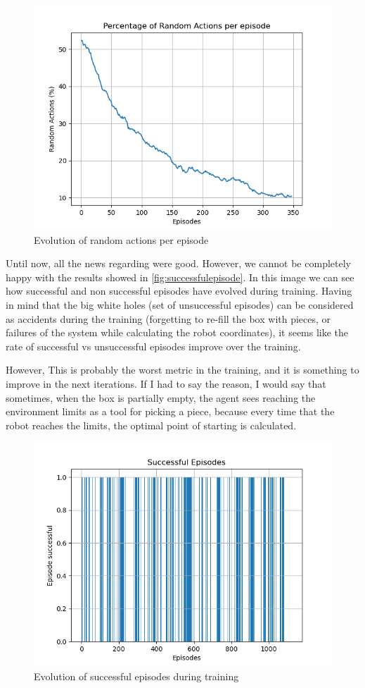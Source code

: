 	\begin{figure}[H]
		\centering
		\includegraphics[width=0.7\linewidth]{Images/original_algorithm/random_actions}
		\caption[Random actions per episodes]{Evolution of random actions per episode}
		\label{fig:randomactions}
	\end{figure}


	Until now, all the news regarding were good. However, we cannot be completely happy with the results showed in \autoref{fig:successfulepisode}. In this image we can see how successful and non successful episodes have evolved during training. Having in mind that the big white holes (set of unsuccessful episodes) can be considered as accidents during the training (forgetting to re-fill the box with pieces, or failures of the system while calculating the robot coordinates), it seems like the rate of successful vs unsuccessful episodes improve over the training.
	
	However, This is probably the worst metric in the training, and it is something to improve in the next iterations. If I had to say the reason, I would say that sometimes, when the box is partially empty, the agent sees reaching the environment limits as a tool for picking a piece, because every time that the robot reaches the limits, the optimal point of starting is calculated.
	
	\begin{figure}
		\centering
		\includegraphics[width=0.7\linewidth]{Images/original_algorithm/successful_episode}
		\caption[Successful episodes]{Evolution of successful episodes during training}
		\label{fig:successfulepisode}
	\end{figure}
	

